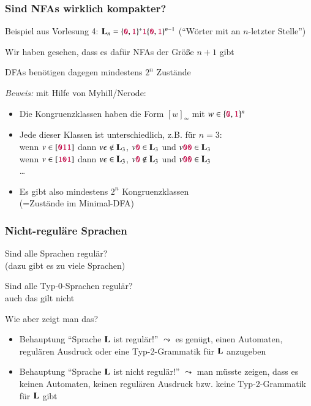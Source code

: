\documentclass[onlymath]{beamer}
\begin{document}
\begin{frame}\frametitle{Sind NFAs wirklich kompakter?}

Beispiel aus Vorlesung 4:
$\textbf{\textcolor{black}{L}}_n= \{\mathtt{\textcolor{purple}{0}},\mathtt{\textcolor{purple}{1}}\}^* \mathtt{\textcolor{purple}{1}} \{\mathtt{\textcolor{purple}{0}},\mathtt{\textcolor{purple}{1}}\}^{n-1}$
("`Wörter mit  an $n$-letzter Stelle"')
\bigskip

Wir haben gesehen, dass es dafür NFAs der Größe $n+1$ gibt
\bigskip

DFAs benötigen dagegen mindestens $2^n$ Zustände\pause
\bigskip

\emph{Beweis:} mit Hilfe von Myhill/Nerode:
\begin{itemize}
\item Die Kongruenzklassen haben die Form $[w]_\simeq$ mit $w\in\{\mathtt{\textcolor{purple}{0}},\mathtt{\textcolor{purple}{1}}\}^n$
\item Jede dieser Klassen ist unterschiedlich, z.B. für $n=3$:\\
wenn $v\in[\mathtt{\textcolor{purple}{011}}]$ dann $v\epsilon\notin\textbf{\textcolor{black}{L}}_3$, $v\mathtt{\textcolor{purple}{0}}\in\textbf{\textcolor{black}{L}}_3$ und $v\mathtt{\textcolor{purple}{00}}\in\textbf{\textcolor{black}{L}}_3$\\
wenn $v\in[\mathtt{\textcolor{purple}{101}}]$ dann $v\epsilon\in\textbf{\textcolor{black}{L}}_3$, $v\mathtt{\textcolor{purple}{0}}\notin\textbf{\textcolor{black}{L}}_3$ und $v\mathtt{\textcolor{purple}{00}}\in\textbf{\textcolor{black}{L}}_3$\\
\ldots
\item Es gibt also mindestens $2^n$ Kongruenzklassen\\(=Zustände im Minimal-DFA)
\end{itemize}

\end{frame}


\begin{frame}\frametitle{Nicht-reguläre Sprachen}

Sind alle Sprachen regulär?\\\pause
{} (dazu gibt es zu viele Sprachen)\pause
\bigskip

Sind alle Typ-0-Sprachen regulär?\\\pause
{} auch das gilt nicht
\bigskip

\alert{Wie aber zeigt man das?}
\begin{itemize}
\item Behauptung "`Sprache $\textbf{\textcolor{black}{L}}$ ist regulär!"' $\leadsto$ es genügt, \alert{einen} Automaten, regulären Ausdruck oder eine Typ-2-Grammatik für $\textbf{\textcolor{black}{L}}$ anzugeben
\item Behauptung "`Sprache $\textbf{\textcolor{black}{L}}$ ist nicht regulär!"' $\leadsto$ man müsste zeigen, dass es \alert{keinen} Automaten, \alert{keinen} regulären Ausdruck bzw. \alert{keine} Typ-2-Grammatik für $\textbf{\textcolor{black}{L}}$ gibt
\end{itemize}

\end{frame}
\end{document}
